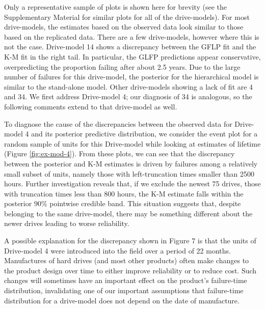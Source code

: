 \documentclass[12pt]{article}
\begin{document}
Only a representative sample of plots is shown here for brevity (see the Supplementary Material for similar plots for all of the drive-models).  For most drive-models, the estimates based on the observed data look similar to those based on the replicated data.  There are a few drive-models, however where this is not the case. Drive-model 14 shows a discrepancy between the GFLP fit and the K-M fit in the right tail. In particular, the GLFP predictions appear conservative, overpredicting the proportion failing after about 2.5 years. Due to the large number of failures for this drive-model, the posterior for the hierarchical model is similar to the stand-alone model. Other drive-models showing a lack of fit are 4 and 34. We first address Drive-model 4; our diagnosis of 34 is analogous, so the following comments extend to that drive-model as well.


To diagnose the cause of the discrepancies between the observed data for Drive-model 4 and its posterior predictive distribution, we consider the event plot for a random sample of units for this Drive-model while looking at estimates of lifetime (Figure \ref{fig:ex-mod-4}). From these plots, we can see that the discrepancy between the posterior and K-M estimates is driven by failures among a relatively small subset of units, namely those with left-truncation times smaller than 2500 hours. Further investigation reveals that, if we exclude the newest 75 drives, those with truncation times less than 800 hours, the K-M estimate falls within the posterior 90\% pointwise credible band. This situation suggests that, despite belonging to the same drive-model, there may be something different about the newer drives leading to worse reliability. 

A possible explanation for the discrepancy shown in Figure 7 is that
the units of Drive-model 4 were introduced into the field over a
period of 22 months. Manufactures of hard drives (and most other
products) often make changes to the product design over time to
either improve reliability or to reduce cost. Such changes will
sometimes have an important effect on the product's failure-time
distribution, invalidating one of our important assumptions that
failure-time distribution for a drive-model does not depend on the
date of manufacture. 
\end{document}
